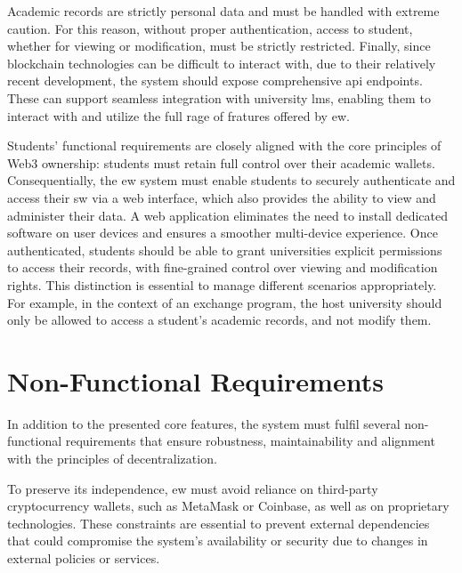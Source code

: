 Academic records are strictly personal data and must be handled with extreme caution. For this reason, without proper authentication, access to student, whether for viewing or modification, must be strictly restricted. 
Finally, since blockchain technologies can be difficult to interact with, due to their relatively recent development, the system should expose comprehensive \acrfull{api} endpoints. These can support seamless integration with university \acrfull{lms}, enabling them to interact with and utilize the full rage of fratures offered by \acrlong{ew}.

Students' functional requirements are closely aligned with the core principles of Web3 ownership: students must retain full control over their academic wallets. Consequentially, the \acrshort{ew} system must enable students to securely authenticate and access their \acrshort{sw} via a web interface, which also provides the ability to view and administer their data. A web application eliminates the need to install dedicated software on user devices and ensures a smoother multi-device experience.
Once authenticated, students should be able to grant universities explicit permissions to access their records, with fine-grained control over viewing and modification rights. This distinction is essential to manage different scenarios appropriately. For example, in the context of an exchange program, the host university should only be allowed to access a student's academic records, and not modify them.



\section{Non-Functional Requirements}
\label{sec:nonFunctionalRequirements}
In addition to the presented core features, the system must fulfil several non-functional requirements that ensure robustness, maintainability and alignment with the principles of decentralization. 

To preserve its independence, \acrshort{ew} must avoid reliance on third-party cryptocurrency wallets, such as MetaMask or Coinbase, as well as on proprietary technologies. These constraints are essential to prevent external dependencies that could compromise the system’s availability or security due to changes in external policies or services.

